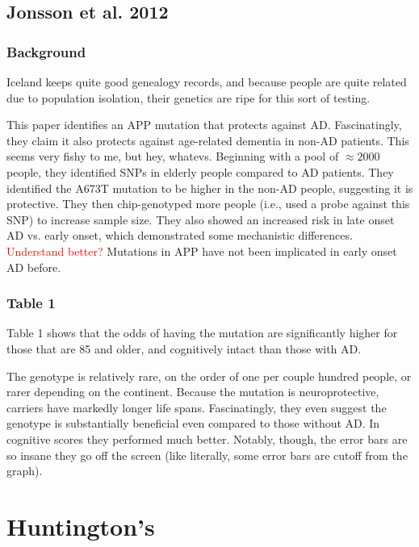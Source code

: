 \documentclass[12pt]{report}
\begin{document}
 \subsection*{Jonsson et al. 2012}

 \subsubsection*{Background}

 Iceland keeps quite good genealogy records, and because people are quite related due to population isolation, their genetics are ripe for this sort of testing.\newline

 This paper identifies an APP mutation that protects against AD. Fascinatingly, they claim it also protects against age-related dementia in non-AD patients. This seems very fishy to me, but hey, whatevs. Beginning with a pool of $\approx 2000$ people, they identified SNPs in elderly people compared to AD patients. They identified the A673T mutation to be higher in the non-AD people, suggesting it is protective. They then chip-genotyped more people (i.e., used a probe against this SNP) to increase sample size. They also showed an increased risk in late onset AD vs. early onset, which demonstrated some mechanistic differences. \textcolor{red}{Understand better?} Mutations in APP have not been implicated in early onset AD before. \newline

 \subsubsection*{Table 1}

 Table 1 shows that the odds of having the mutation are significantly higher for those that are 85 and older, and cognitively intact than those with AD.\newline

 The genotype is relatively rare, on the order of one per couple hundred people, or rarer depending on the continent. Because the mutation is neuroprotective, carriers have markedly longer life spans. Fascinatingly, they even suggest the genotype is substantially beneficial even compared to those without AD. In cognitive scores they performed much better. Notably, though, the error bars are so insane they go off the screen (like literally, some error bars are cutoff from the graph).\newline

 \section{Huntington's}
\end{document}
